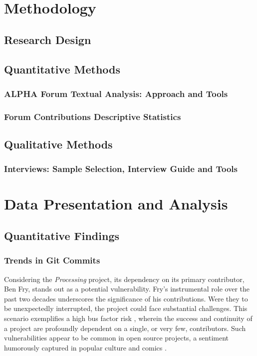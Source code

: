 \documentclass{article}
\begin{document}
\section{Methodology}

\subsection{Research Design}
\subsection{Quantitative Methods}
\subsubsection{ALPHA Forum Textual Analysis: Approach and Tools}
\subsubsection{Forum Contributions Descriptive Statistics}

\subsection{Qualitative Methods}
\subsubsection{Interviews: Sample Selection, Interview Guide and Tools}

\section{Data Presentation and Analysis}

\subsection{Quantitative Findings}
\subsubsection{Trends in Git Commits}

Considering the \textit{Processing} project, its dependency on its primary contributor, Ben Fry, stands out as a potential vulnerability. Fry's instrumental role over the past two decades underscores the significance of his contributions. Were they to be unexpectedly interrupted, the project could face substantial challenges. This scenario exemplifies a high bus factor risk \parencite{BusFactor2023}, wherein the success and continuity of a project are profoundly dependent on a single, or very few, contributors. Such vulnerabilities appear to be common in open source projects, a sentiment humorously captured in popular culture and comics \parencite{munroeDependency2020}.
\end{document}
